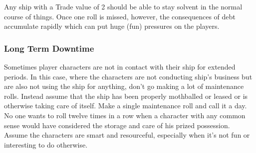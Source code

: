 Any ship with a Trade value of 2 should be able to stay solvent in the normal course of things. Once one roll is missed, however, the consequences of debt accumulate rapidly which can put huge (fun) pressures on the players.


\subsubsection{Long Term Downtime}\label{sec:long-term-downtime}
Sometimes player characters are not in contact with their ship for extended periods. In this case, where the characters are not conducting ship's business but are also not using the ship for anything, don't go making a lot of maintenance rolls. Instead assume that the ship has been properly mothballed or leased or is otherwise taking care of itself. Make a single maintenance roll and call it a day. No one wants to roll twelve times in a row when a character with any common sense would have considered the storage and care of his prized possession. Assume the characters are smart and resourceful, especially when it's not fun or interesting to do otherwise.
